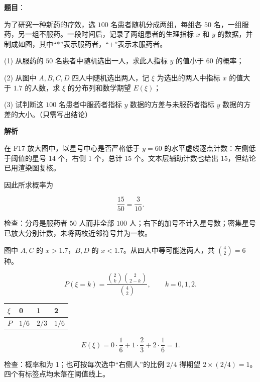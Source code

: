 \begin{answer}

\textbf{题目}：

为了研究一种新药的疗效，选 $100$ 名患者随机分成两组，每组各 $50$ 名，一组服药，另一组不服药。一段时间后，记录了两组患者的生理指标 $x$ 和 $y$ 的数据，并制成如图，其中“$\ast$”表示服药者，“$+$”表示未服药者。
\nopagebreak[4]
\begin{center}\end{center}
\nopagebreak[4]
(1) 从服药的 $50$ 名患者中随机选出一人，求此人指标 $y$ 的值小于 $60$ 的概率；

(2) 从图中 $A,B,C,D$ 四人中随机选出两人，记 $\xi$ 为选出的两人中指标 $x$ 的值大于 $1.7$ 的人数，求 $\xi$ 的分布列和数学期望 $E(\xi)$；

(3) 试判断这 $100$ 名患者中服药者指标 $y$ 数据的方差与未服药者指标 $y$ 数据的方差的大小。（只需写出结论）

\textbf{解析}


在 F17 放大图中，以星号中心是否严格低于 $y=60$ 的水平虚线逐点计数：左侧低于阈值的星号 14 个，右侧 1 个，总计 15 个。文本层辅助计数也给出 15，但结论已用渲染图复核。

因此所求概率为

\nopagebreak[4]
\[\boxed{\frac{15}{50}=\frac3{10}}.\]

检查：分母是服药者 $50$ 人而非全部 $100$ 人；右下的加号不计入星号数；密集星号已放大分别计数，未将两枚近邻符号并为一枚。


图中 $A,C$ 的 $x>1.7$，$B,D$ 的 $x<1.7$。从四人中等可能选两人，共 $\binom42=6$ 种。

\nopagebreak[4]
\[P(\xi=k)=\frac{\binom2k\binom2{2-k}}{\binom42},\qquad k=0,1,2.\]

\begin{center}
\begin{tabular}{llll}
\toprule
$\xi$ & 0 & 1 & 2 \\
\midrule
$P$ & $1/6$ & $2/3$ & $1/6$ \\
\bottomrule
\end{tabular}
\end{center}

\nopagebreak[4]
\[\boxed{E(\xi)=0\cdot\frac16+1\cdot\frac23+2\cdot\frac16=1}.\]

检查：概率和为 1；也可按每次选中“右侧人”的比例 $2/4$ 得期望 $2\times(2/4)=1$。四个有标签点均未落在阈值线上。


\end{answer}
